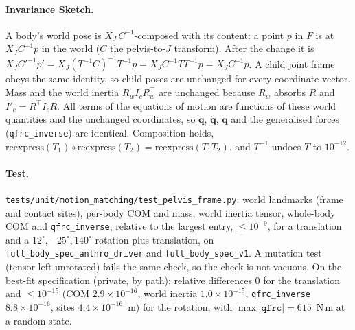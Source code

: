 \paragraph{Invariance Sketch.} A body's world pose is $X_J\,C^{-1}$-composed with its
content: a point $p$ in $F$ is at $X_J C^{-1} p$ in the world ($C$ the pelvis-to-$J$
transform). After the change it is $X_J C'^{-1} p' = X_J (T^{-1}C)^{-1} T^{-1}p
= X_J C^{-1} T T^{-1} p = X_J C^{-1}p$. A child joint frame obeys the same identity, so
child poses are unchanged for every coordinate vector. Mass and the world inertia
$R_w I_c R_w^\top$ are unchanged because $R_w$ absorbs $R$ and $I'_c=R^\top I_c R$.
All terms of the equations of motion are functions of these world quantities and the
unchanged coordinates, so $\mathbf q$, $\dot{\mathbf q}$, $\ddot{\mathbf q}$ and the
generalised forces (\texttt{qfrc\_inverse}) are identical. Composition holds,
$\mathrm{reexpress}(T_1)\circ\mathrm{reexpress}(T_2)=\mathrm{reexpress}(T_1T_2)$, and
$T^{-1}$ undoes $T$ to $10^{-12}$.

\paragraph{Test.} \texttt{tests/unit/motion\_matching/test\_pelvis\_frame.py}: world
landmarks (frame and contact sites), per-body COM and mass, world inertia tensor,
whole-body COM and \texttt{qfrc\_inverse}, relative to the largest entry, $\le10^{-9}$,
for a translation and a $12^\circ,-25^\circ,140^\circ$ rotation plus translation, on
\texttt{full\_body\_spec\_anthro\_driver} and \texttt{full\_body\_spec\_v1}. A mutation
test (tensor left unrotated) fails the same check, so the check is not vacuous. On the
best-fit specification (private, by path): relative differences $0$ for the translation
and $\le 10^{-15}$ (COM $2.9\times10^{-16}$, world inertia $1.0\times10^{-15}$,
\texttt{qfrc\_inverse} $8.8\times10^{-16}$, sites $4.4\times10^{-16}$~m) for the
rotation, with $\max|\mathtt{qfrc}|=615$~N\,m at a random state.

